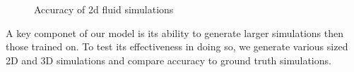\documentclass{article}
\begin{document}
\begin{figure}[!t]
\caption{Accuracy of 2d fluid simulations }
\label{2d_error_plot}
\end{figure}


A key componet of our model is its ability to generate larger simulations then those trained on. To test its effectiveness in doing so, we generate various sized 2D and 3D simulations and compare accuracy to ground truth simulations.
\end{document}
